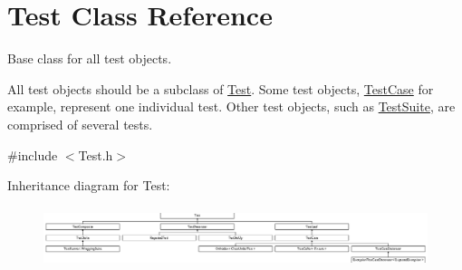 \hypertarget{class_test}{}\section{Test Class Reference}
\label{class_test}


Base class for all test objects.

All test objects should be a subclass of \hyperlink{class_test}{Test}. Some test objects, \hyperlink{class_test_case}{Test\+Case} for example, represent one individual test. Other test objects, such as \hyperlink{class_test_suite}{Test\+Suite}, are comprised of several tests.  




{\ttfamily \#include $<$Test.\+h$>$}

Inheritance diagram for Test\+:\begin{figure}[H]
\begin{center}
\leavevmode
\includegraphics[height=1.777778cm]{class_test}
\end{center}
\end{figure}
